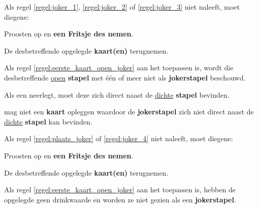 \vervolgLijst{}
\item Als \eenSpeler regel \ref{regel:joker_1}, \ref{regel:joker_2} of \ref{regel:joker_3} niet naleeft, moet diegene:
\puntLijst{}
\item Proosten op  en \textbf{een Fritsje des nemen}\footnotemark[3].
\item De desbetreffende opgelegde \textbf{kaart(en)} terugnemen.
\eindPuntLijst{}
\label{regel:kaarten_terugnemen_3}
\eindLijst{}

\vervolgLijst{}
\item Als \Frits regel \ref{regel:eerste_kaart_open_joker} aan het toepassen is, wordt die desbetreffende \ul{open} \textbf{stapel} met \'e\'en of meer  niet als \textbf{jokerstapel} beschouwd.
\eindLijst{}


\vervolgLijst{}
\item Als \eenSpeler een \footnotemark[1] neerlegt, moet deze zich direct naast de \ul{dichte} \textbf{stapel} bevinden.
\label{regel:plaats_joker}
\eindLijst{}

\vervolgLijst{}
\item \EenSpeler mag niet een \textbf{kaart} opleggen waardoor de \textbf{jokerstapel} zich niet direct naast de \ul{dichte} \textbf{stapel} kan bevinden.
\label{regel:joker_4}
\eindLijst{}

\vervolgLijst{}
\item Als \eenSpeler regel \ref{regel:plaats_joker} of \ref{regel:joker_4} niet naleeft, moet diegene:
\puntLijst{}
\item Proosten op  en \textbf{een Fritsje des nemen}\footnotemark[3].
\item De desbetreffende opgelegde \textbf{kaart(en)} terugnemen.
\eindPuntLijst{}
\label{regel:kaarten_terugnemen_4}
\eindLijst{}


\vervolgLijst{}
\item Als \Frits regel \ref{regel:eerste_kaart_open_joker} aan het toepassen is, hebben de opgelegde \footnotemark[1] geen drinkwaarde en worden ze niet gezien als een \textbf{jokerstapel}.
\eindLijst{}

